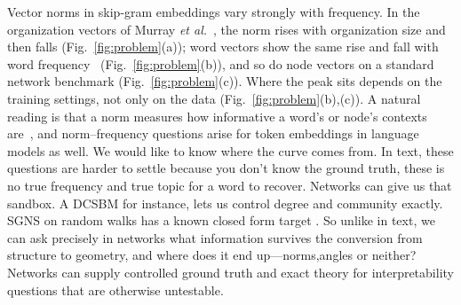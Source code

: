 \documentclass[aps,pre,reprint,superscriptaddress,longbibliography]{revtex4-2}
\begin{document}
Vector norms in skip-gram embeddings vary strongly with frequency.
In the organization vectors of Murray \textit{et al.}~\cite{murray2023unsupervised}, the norm rises with organization size and then falls (Fig.~\ref{fig:problem}(a)); word vectors show the same rise and fall with word frequency~\cite{schakel2015measuring} (Fig.~\ref{fig:problem}(b)), and so do node vectors on a standard network benchmark (Fig.~\ref{fig:problem}(c)).
Where the peak sits depends on the training settings, not only on the data (Fig.~\ref{fig:problem}(b),(c)).
A natural reading is that a norm measures how informative a word's or node's contexts are~\cite{schakel2015measuring,oyama2022norm}, and norm--frequency questions arise for token embeddings in language models as well.
We would like to know where the curve comes from.
In text, these questions are harder to settle because you don't know the ground truth, these is no true frequency and true topic for a word to recover. 
Networks can give us that sandbox. 
A DCSBM for instance, lets us control degree and community exactly. 
SGNS on random walks has a known closed form target \cite{qiu2018network}.
So unlike in text, we can ask precisely in networks what information survives the conversion from structure to geometry, and where does it end up—norms,angles or neither?
Networks can supply controlled ground truth and exact theory for interpretability questions that are otherwise untestable.
\end{document}
